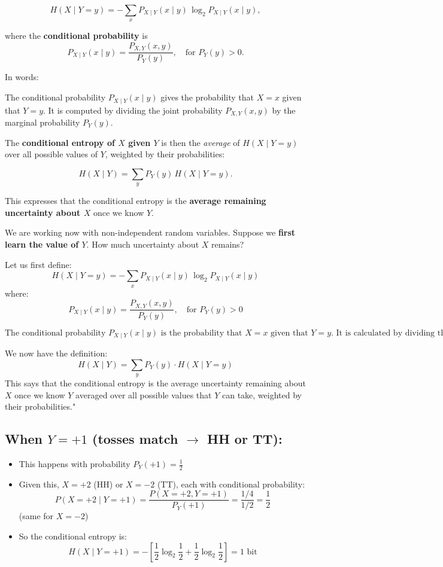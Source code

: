 \documentclass[11pt]{article}
\begin{document}
\[
H(X \mid Y = y) = - \sum_x P_{X \mid Y}(x \mid y) \, \log_2 P_{X \mid Y}(x \mid y),
\]

where the \textbf{conditional probability} is
\[
P_{X \mid Y}(x \mid y) = \frac{P_{X,Y}(x, y)}{P_Y(y)}, \quad \text{for } P_Y(y) > 0.
\]

\noindent In words: 

The conditional probability $P_{X \mid Y}(x \mid y)$ gives the probability that $X = x$ 
 given that $Y = y$. It is computed by dividing the joint probability $P_{X,Y}(x,y)$ 
by the marginal probability $P_Y(y)$.


The \textbf{conditional entropy of $X$ given $Y$} is then the \emph{average} of $H(X \mid Y = y)$ over all possible values of $Y$, weighted by their probabilities:

\[
H(X \mid Y) = \sum_y P_Y(y) \, H(X \mid Y = y).
\]

This expresses that the conditional entropy is the \textbf{average remaining uncertainty about $X$} once we know $Y$.







We are working now with non-independent random variables. Suppose we \textbf{first learn the value of $Y$}. How much uncertainty about $X$ remains?

Let us first define:
\[
H(X \mid Y = y) = - \sum_x P_{X \mid Y}(x \mid y) \, \log_2 P_{X \mid Y}(x \mid y)
\]
where:
\[
P_{X \mid Y}(x \mid y) = \frac{P_{X,Y}(x, y)}{P_Y(y)}, \quad \text{for } P_Y(y) > 0
\]

\[\text{The conditional probability } P_{X \mid Y}(x \mid y) \text{ is the probability that } X = x 
\text{ given that } Y = y. \text{ It is calculated by dividing the joint probability } 
P_{X,Y}(x,y) \text{ by the marginal probability } P_Y(y).\]


We now have the definition:
\[
H(X \mid Y) = \sum_y P_Y(y) \cdot H(X \mid Y = y)
\]
This says that the conditional entropy 
is the average uncertainty remaining about 
$X$
once we know 
$Y$
averaged over all possible values that 
$Y$
can take, weighted by their probabilities."

\subsection*{When $Y = +1$ (tosses match $\to$ HH or TT):}
\begin{itemize}
    \item This happens with probability $P_Y(+1) = \frac{1}{2}$
    \item Given this, $X = +2$ (HH) or $X = -2$ (TT), each with conditional probability:
    \[
    P(X = +2 \mid Y = +1) = \frac{P(X=+2, Y=+1)}{P_Y(+1)} = \frac{1/4}{1/2} = \frac{1}{2}
    \]
    (same for $X = -2$)
    \item So the conditional entropy is:
    \[
    H(X \mid Y = +1) = -\left[ \frac{1}{2} \log_2 \frac{1}{2} + \frac{1}{2} \log_2 \frac{1}{2} \right] = 1 \text{ bit}
    \]
\end{itemize}
\end{document}
